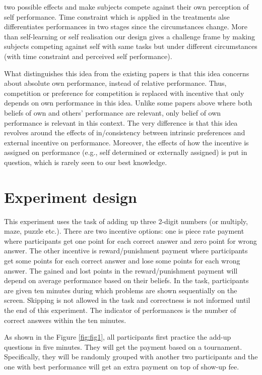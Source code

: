 \documentclass[12pt]{article}
\begin{document}
two possible effects and make subjects compete against their own perception of self performance. Time constraint which is applied in the treatments alse differentiates performances in two stages since the circumstances change. More than self-learning or self realisation our design gives a challenge frame by making subjects competing against self with same tasks but under different circumstances (with time constraint and perceived self performance). 

What distinguishes this idea from the existing papers is that this idea concerns about absolute own performance, instead of relative performance. Thus, competition or preference for competition is replaced with incentive that only depends on own performance in this idea. Unlike some papers above where both beliefs of own and others' performance are relevant, only belief of own performance is relevant in this context. The very difference is that this idea revolves around the effects of in/consistency between intrinsic preferences and external incentive on performance. Moreover, the effects of how the incentive is assigned on performance (e.g., self determined or externally assigned) is put in question, which is rarely seen to our best knowledge.

\section{Experiment design}

This experiment uses the task of adding up three 2-digit numbers (or multiply, maze, puzzle etc.). There are two incentive options: one is piece rate payment where participants get one point for each correct answer and zero point for wrong answer. The other incentive is reward/punishment payment where participants get some points for each correct answer and lose some points for each wrong answer. The gained and lost points in the reward/punishment payment will depend on average performance based on their beliefs. In the task, participants are given ten minutes during which problems are shown sequentially on the screen. Skipping is not allowed in the task and correctness is not informed until the end of this experiment. The indicator of performances is the number of correct answers within the ten minutes.

As shown in the Figure \ref{fig:fig1}, all participants first practice the add-up questions in five minutes. They will get the payment based on a tournament. Specifically, they will be randomly grouped with another two participants and the one with best performance will get an extra payment on top of show-up fee.
\end{document}
